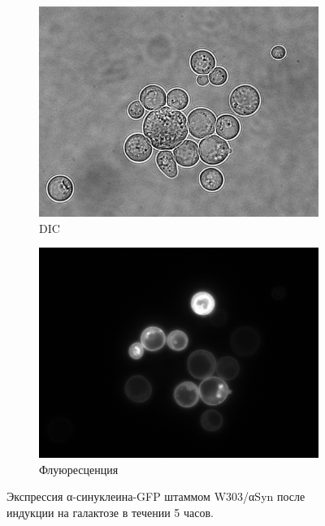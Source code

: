 \begin{figure}[h]
	\centering
	\begin{subfigure}[t]{0.49\textwidth}
		\includegraphics[width = \textwidth]{pics/1246_5hrs_GAL-4-0.png}
		\caption{DIC}\label{fig:}

	\end{subfigure}
	\begin{subfigure}[t]{0.49\linewidth}
		\includegraphics[width = \textwidth]{pics/1246_5hrs_GAL-4-1.png}
		\caption{Флуюресценция}\label{fig:}
	\end{subfigure}

	\caption{Экспрессия α-синуклеина-GFP штаммом W303/αSyn после индукции на галактозе в течении 5 часов.}
	\label{fig:fluo}	
\end{figure}


